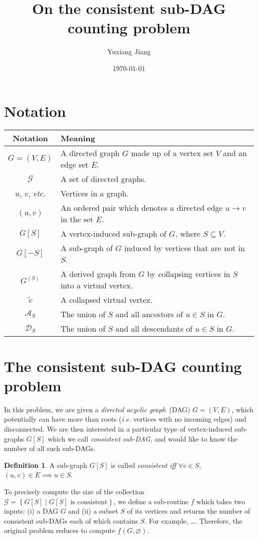 \documentclass[11pt]{article}
\title{On the consistent sub-DAG counting problem}
\author{Yuxiang Jiang}
\date{\today}
\theoremstyle{definition}
\newtheorem{definition}{Definition}[section]
\newcommand{\subg}[2]{\ensuremath{{#1}[#2]}}
\newcommand{\colg}[2]{\ensuremath{{#1}^{\left(#2\right)}}}
\newcommand{\ance}[1]{\ensuremath{\mathcal{A}_{#1}}}
\newcommand{\desc}[1]{\ensuremath{\mathcal{D}_{#1}}}
\begin{document}
\maketitle
\section{Notation}
\begin{table}[htp!]
    \renewcommand\arraystretch{1.5}
    \begin{tabular}{c|l}
        \hline\hline
        Notation & Meaning \\ \hline
        $G = (V, E)$ & A directed graph $G$ made up of a vertex set $V$ and an edge set $E$.\\
        $\mathcal{G}$ & A set of directed graphs.\\
        $u$, $v$, \textit{etc.} & Vertices in a graph.\\
        $(u, v)$ & An ordered pair which denotes a directed edge $u \to v$ in the set $E$.\\
        $\subg{G}{S}$ & A vertex-induced sub-graph of $G$, where $S \subseteq V$.\\
        $\subg{G}{-S}$ & A sub-graph of $G$ induced by vertices that are not in $S$.\\
        $\colg{G}{S}$ & A derived graph from $G$ by collapsing vertices in $S$ into a virtual vertex.\\
        $\tilde{v}$ & A collapsed virtual vertex.\\
        $\ance{S}$ & The union of $S$ and all ancestors of $u \in S$ in $G$.\\
        $\desc{S}$ & The union of $S$ and all descendants of $u \in S$ in $G$.\\
        \hline
    \end{tabular}
\end{table}

\section{The consistent sub-DAG counting problem}
In this problem, we are given a \emph{directed acyclic graph}~(DAG) $G=(V,E)$, which potentially can have more than roots (\textit{i.e.} vertices with no incoming edges) and disconnected. We are then interested in a particular type of vertex-induced sub-graphs $\subg{G}{S}$ which we call \emph{consistent sub-DAG}, and would like to know the number of all such sub-DAGs.
\begin{definition}
    A sub-graph $\subg{G}{S}$ is called \emph{consistent} \textit{iff} $\forall v \in S$, $(u, v) \in E \implies u \in S$.
\end{definition}
To precisely compute the size of the collection $\mathcal{G} = \left\{\subg{G}{S} \mid \subg{G}{S} \mbox{ is consistent}\right\}$, we define a sub-routine $f$ which takes two inputs: (i) a DAG $G$ and (ii) a subset $S$ of its vertices and returns the number of consistent sub-DAGs each of which contains $S$. For example, \dots. Therefore, the original problem reduces to compute $f(G, \varnothing)$.
\end{document}
